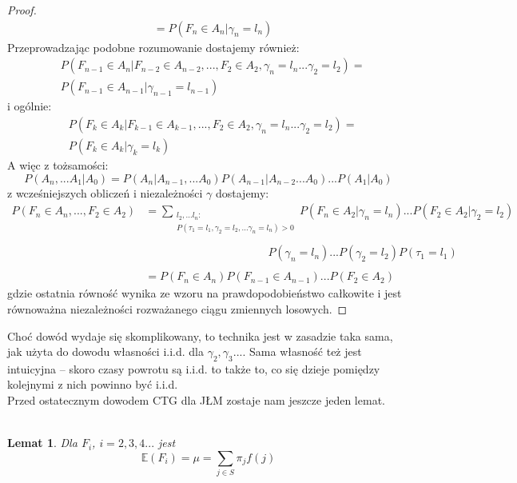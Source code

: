 \documentclass[a4paper]{article}
\theoremstyle{defn}
\theoremstyle{theorem}
\theoremstyle{lemma}
\newtheorem{lemma}[defn]{Lemat}
\theoremstyle{cor}
\theoremstyle{fact}
\begin{document}
\begin{proof}
\begin{align*}
    &= P(F_n \in A_n | \gamma_n = l_n)
\end{align*}
Przeprowadzając podobne rozumowanie dostajemy również:
\begin{align*}
&P(F_{n-1} \in A_n|F_{n-2} \in A_{n-2},  ..., F_2 \in A_2, \gamma_n = l_n ... \gamma_2 = l_2) =\\ & P(F_{n-1} \in A_{n-1} | \gamma_{n-1} = l_{n-1})
\end{align*}
i ogólnie:
\begin{align*}
&P(F_{k} \in A_k|F_{k-1} \in A_{k-1},  ..., F_2 \in A_2, \gamma_n = l_n ... \gamma_2 = l_2) =\\ & P(F_{k} \in A_{k} | \gamma_{k} = l_{k})
\end{align*}
A więc z tożsamości:
$$P(A_n, ... A_1|A_0) = P(A_n|A_{n-1}, ...A_0)P(A_{n-1}|A_{n-2}...A_0)...P(A_1|A_0)$$
z wcześniejszych obliczeń i niezależności $\gamma$ dostajemy:
\begin{align*}
    P(F_n \in A_n, ..., F_2 \in A_2) &= \sum\limits_{\substack{l_2, ... l_n:\\P(\tau_1 = l_1, \gamma_2 = l_2, ... \gamma_n = l_n) > 0}} P(F_n \in A_2|\gamma_n = l_n) ... P(F_2 \in A_2|\gamma_2 = l_2)\\\\
    &\quad\quad\quad\quad\quad\quad\quad\quad\quad\quad\quad P(\gamma_n = l_n) ... P(\gamma_2 = l_2)P(\tau_1 = l_1)\\\\
    &= P(F_n \in A_n)P(F_{n-1} \in A_{n-1}) ... P(F_2 \in A_2)
\end{align*}
gdzie ostatnia równość wynika ze wzoru na prawdopodobieństwo całkowite i jest równoważna niezależności rozważanego ciągu zmiennych losowych.
\end{proof}
Choć dowód wydaje się skomplikowany, to technika jest w zasadzie taka sama, jak użyta do dowodu własności i.i.d. dla $\gamma_2, \gamma_3 ...$. Sama własność też jest intuicyjna – skoro czasy powrotu są i.i.d. to także to, co się dzieje pomiędzy kolejnymi z nich powinno być i.i.d.\\
Przed ostatecznym dowodem CTG dla JŁM zostaje nam jeszcze jeden lemat.\\
\\
\begin{lemma}\label{lemma2.6.4}
Dla $F_i$, $i=2,3,4...$ jest
$$\mathbb{E}(F_i) = \mu = \sum\limits_{j \in S} \pi_j f(j)$$
\end{lemma}
\end{document}
